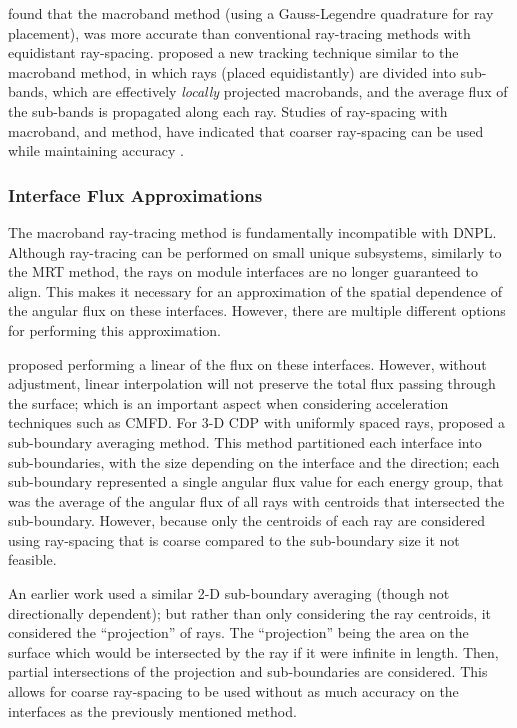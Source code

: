 {{{        \citet{Yamamoto2005} found that the macroband method (using a Gauss-Legendre quadrature for ray placement), was more accurate than conventional ray-tracing methods with equidistant ray-spacing.
        \citet{Fevotte2007} proposed a new tracking technique similar to the macroband method, in which rays (placed equidistantly) are divided into sub-bands, which are effectively \emph{locally} projected macrobands, and the average flux of the sub-bands is propagated along each ray.
        Studies of ray-spacing with macroband, and  method, have indicated that coarser ray-spacing can be used while maintaining accuracy \cite{Yamamoto2005,Fevotte2007,Yamamoto2008}.

        \subsubsection{Interface Flux Approximations}{\label{sssec:RT:Interface Flux Approximations}
          The macroband ray-tracing method is fundamentally incompatible with \acf{DNPL}.
          Although ray-tracing can be performed on small unique subsystems, similarly to the \ac{MRT} method, the rays on module interfaces are no longer guaranteed to align.
          This makes it necessary for an approximation of the spatial dependence of the angular flux on these interfaces.
          However, there are multiple different options for performing this approximation.

          \citet{Yamamoto2005} proposed performing a linear of the flux on these interfaces.
          However, without adjustment, linear interpolation will not preserve the total flux passing through the surface; which is an important aspect when considering acceleration techniques such as \ac{CMFD}.
          For 3-D \ac{CDP} with uniformly spaced rays, \citet{Liu2014} proposed a sub-boundary averaging method.
          This method partitioned each interface into sub-boundaries, with the size depending on the interface and the direction; each sub-boundary represented a single angular flux value for each energy group, that was the average of the angular flux of all rays with centroids that intersected the sub-boundary.
          However, because only the centroids of each ray are considered using ray-spacing that is coarse compared to the sub-boundary size it not feasible.

          An earlier work \cite{Hong1999} used a similar 2-D sub-boundary averaging (though not directionally dependent); but rather than only considering the ray centroids, it considered the ``projection'' of rays.
          The ``projection'' being the area on the surface which would be intersected by the ray if it were infinite in length.
          Then, partial intersections of the projection and sub-boundaries are considered.
          This allows for coarse ray-spacing to be used without as much accuracy on the interfaces as the previously mentioned method.

}}}}
